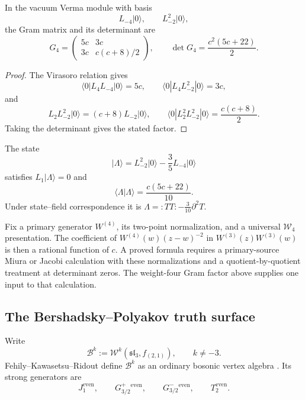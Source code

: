 \begin{proposition}
\label{prop:gram-wt4}
\ClaimStatusProvedHere
In the vacuum Verma module with basis
\[
L_{-4}\lvert0\rangle,\qquad L_{-2}^2\lvert0\rangle,
\]
the Gram matrix and its determinant are
\[
G_4=
\begin{pmatrix}
5c&3c\\[2pt]
3c&c(c+8)/2
\end{pmatrix},
\qquad
\det G_4=\frac{c^2(5c+22)}2.
\]
\end{proposition}

\begin{proof}
The Virasoro relation gives
\[
\langle0|L_4L_{-4}|0\rangle=5c,\qquad
\langle0|L_4L_{-2}^2|0\rangle=3c,
\]
and
\[
L_2L_{-2}^2|0\rangle=(c+8)L_{-2}|0\rangle,
\qquad
\langle0|L_2^2L_{-2}^2|0\rangle=\frac{c(c+8)}2.
\]
Taking the determinant gives the stated factor.
\end{proof}

\begin{corollary}
\label{cor:lambda-qp}
\ClaimStatusProvedHere
The state
\[
\lvert\Lambda\rangle
=L_{-2}^2\lvert0\rangle-\frac35L_{-4}\lvert0\rangle
\]
satisfies \(L_1\lvert\Lambda\rangle=0\) and
\[
\langle\Lambda|\Lambda\rangle=\frac{c(5c+22)}{10}.
\]
Under state--field correspondence it is
\(\Lambda={:}TT{:}-\frac3{10}\partial^2T\).
\end{corollary}

\begin{theorem}
\label{thm:c334}
\ClaimStatusOpen
Fix a primary generator \(W^{(4)}\), its two-point normalization,
and a universal \(\mathcal W_4\) presentation.  The coefficient of
\(W^{(4)}(w)(z-w)^{-2}\) in
\(W^{(3)}(z)W^{(3)}(w)\) is then a rational function of \(c\).
A proved formula requires a primary-source Miura or Jacobi
calculation with these normalizations and a quotient-by-quotient
treatment at determinant zeros.  The weight-four Gram factor above
supplies one input to that calculation.
\end{theorem}

\subsection{The Bershadsky--Polyakov truth surface}
\label{sec:bp-truth-surface}

Write
\[
\mathcal B^k
:=\mathcal W^k(\mathfrak{sl}_3,f_{(2,1)}),
\qquad k\ne-3.
\]
Fehily--Kawasetsu--Ridout define \(\mathcal B^k\) as an ordinary
bosonic vertex algebra \cite[Definition~2.1]{FKR20}.  Its strong
generators are
\[
J_{1}^{\mathrm{even}},\qquad
G^+_{3/2}^{\mathrm{even}},\qquad
G^-_{3/2}^{\mathrm{even}},\qquad
T_{2}^{\mathrm{even}}.
\]

